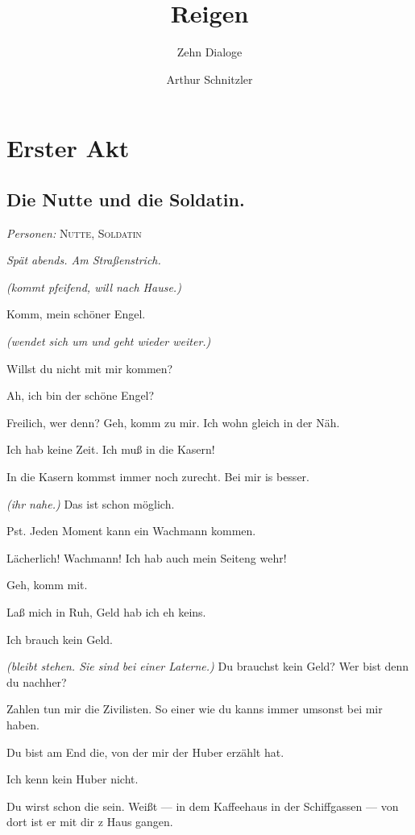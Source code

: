 \documentclass[
	final,
	a4paper,
	ngerman,
	mpinclude = true, %
	twoside = true,
	open = right,
	cleardoublepage = plain,
	DIV = 13,
	BCOR = 1cm,
	titlepage = firstiscover,
	]{scrbook}
\title{Reigen}
\subtitle{Zehn Dialoge}
\author{Arthur Schnitzler}
\date{\ifdirectorsversion{--- Regie-Version ---}{}}
\newcommand{\act}{\chapter}
\newcommand{\scene}{\section}
\newcommand{\direction}[1]{\textit{(#1)}}
\newcommand{\setting}[1]{\vspace{-0.5\baselineskip}\centering\textit{#1}}
\newcommand{\characterlist}[1]{{\begin{center}\textit{Personen:} #1\end{center}}}
\newcommand{\thecharacter}[1]{\textup{\textsc{#1}}\xspace}
\newcommand{\thedirne}{\thecharacter{Nutte}}
\newcommand{\thesoldat}{\thecharacter{Soldatin}}
\newcommand{\character}[1]{\item[#1:]}
\newcommand{\dirne}{\character{\thedirne}}
\newcommand{\soldat}{\character{\thesoldat}}
\begin{document}

\cleardoubleoddemptypage

\maketitle

\tableofcontents
\cleardoubleoddpage

\pagestyle{headings}
\doublespacing

\act{Erster Akt}
\scene{Die Nutte und die Soldatin.}
\characterlist{\thedirne, \thesoldat}
\setting{Spät abends. Am Straßenstrich.}
\begin{play}
	\soldat
	\direction{kommt pfeifend, will nach Hause.}

	\dirne
	Komm, mein schöner Engel.

	\soldat
	\direction{wendet sich um und geht wieder weiter.}

	\dirne
	Willst du nicht mit mir kommen?

	\soldat
	Ah, ich bin der schöne Engel?

	\dirne
	Freilich, wer denn? Geh, komm zu mir. Ich wohn gleich in der Näh.

	\soldat
	Ich hab keine Zeit. Ich muß in die Kasern!

	\dirne
	In die Kasern kommst immer noch zurecht. Bei mir is besser.

	\soldat
	\direction{ihr nahe.} Das ist schon möglich.

	\dirne
	Pst. Jeden Moment kann ein Wachmann kommen.

	\soldat
	Lächerlich! Wachmann! Ich hab auch mein Seiteng wehr!

	\dirne
	Geh, komm mit.

	\soldat
	Laß mich in Ruh, Geld hab ich eh keins.

	\dirne
	Ich brauch kein Geld.

	\soldat
	\direction{bleibt stehen. Sie sind bei einer Laterne.} Du brauchst kein Geld? Wer bist denn du nachher?

	\dirne
	Zahlen tun mir die Zivilisten. So einer wie du kanns immer umsonst bei mir haben.

	\soldat
	Du bist am End die, von der mir der Huber erzählt hat.

	\dirne
	Ich kenn kein Huber nicht.

	\soldat
	Du wirst schon die sein. Weißt --- in dem Kaffeehaus in der Schiffgassen --- von dort ist er mit dir z Haus gangen.


\end{play}
\end{document}
